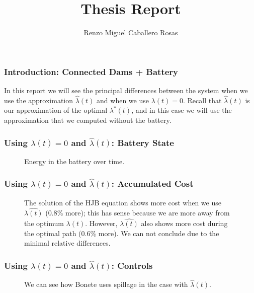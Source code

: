 \documentclass[aspectratio=169]{beamer}\usepackage[utf8]{inputenc}
\title{Thesis Report}
\subtitle{Renzo Miguel Caballero Rosas}
\begin{document}
\begin{frame}
\titlepage
\end{frame}

\begin{frame}\frametitle{Introduction: Connected Dams + Battery}
In this report we will see the principal differences between the system when we use the approximation $\hat{\lambda}(t)$ and when we use $\lambda(t)=0$. Recall that $\hat{\lambda}(t)$ is our approximation of the optimal $\lambda^*(t)$, and in this case we will use the approximation that we computed without the battery.
\end{frame}

\begin{frame}\frametitle{Using $\lambda(t)=0$ and $\hat{\lambda}(t)$: Battery State}
\begin{figure}[ht!]
\centering
{}
\caption{Energy in the battery over time.}
\end{figure}
\end{frame}

\begin{frame}\frametitle{Using $\lambda(t)=0$ and $\hat{\lambda}(t)$: Accumulated Cost}
\begin{figure}[ht!]
\centering
{}
\caption{The solution of the HJB equation shows more cost when we use $\hat{\lambda(t)}$ (0.8\% more); this has sense because we are more away from the optimum $\lambda(t)$. However, $\hat{\lambda(t)}$ also shows more cost during the optimal path (0.6\% more). We can not conclude due to the minimal relative differences.}
\end{figure}
\end{frame}

\begin{frame}\frametitle{Using $\lambda(t)=0$ and $\hat{\lambda}(t)$: Controls}
\begin{figure}[ht!]
\centering
{}
\caption{We can see how Bonete uses spillage in the case with $\hat{\lambda}(t)$.}
\end{figure}
\end{frame}
\end{document}
